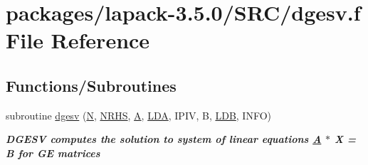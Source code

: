 \hypertarget{dgesv_8f}{}\section{packages/lapack-\/3.5.0/\+S\+R\+C/dgesv.f File Reference}
\label{dgesv_8f}
\subsection*{Functions/\+Subroutines}
\begin{DoxyCompactItemize}
\item 
subroutine \hyperlink{group__doubleGEsolve_ga5ee879032a8365897c3ba91e3dc8d512}{dgesv} (\hyperlink{polmisc_8c_a0240ac851181b84ac374872dc5434ee4}{N}, \hyperlink{example__user_8c_aa0138da002ce2a90360df2f521eb3198}{N\+R\+H\+S}, \hyperlink{classA}{A}, \hyperlink{example__user_8c_ae946da542ce0db94dced19b2ecefd1aa}{L\+D\+A}, I\+P\+I\+V, B, \hyperlink{example__user_8c_a50e90a7104df172b5a89a06c47fcca04}{L\+D\+B}, I\+N\+F\+O)
\begin{DoxyCompactList}\small\item\em {\bfseries  D\+G\+E\+S\+V computes the solution to system of linear equations \hyperlink{classA}{A} $\ast$ X = B for G\+E matrices} \end{DoxyCompactList}\end{DoxyCompactItemize}
